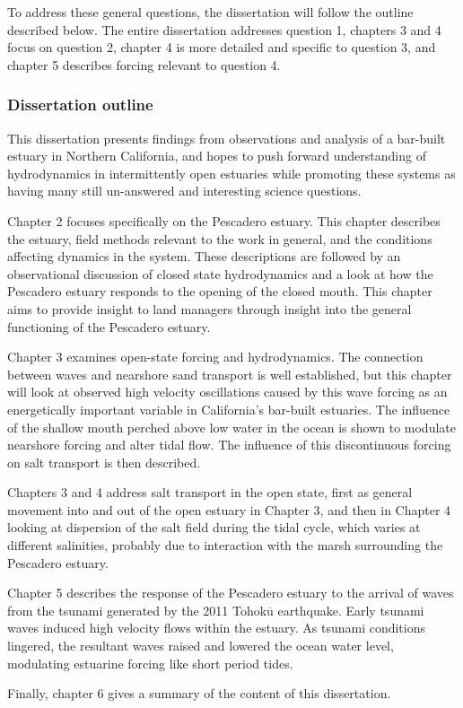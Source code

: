 To address these general questions, the dissertation will follow the outline described below. The entire dissertation addresses question 1, chapters 3 and 4 focus on question 2, chapter 4 is more detailed and specific to question 3, and chapter 5 describes forcing relevant to question 4.

\subsubsection{Dissertation outline}

This dissertation presents findings from observations and analysis of a bar-built estuary in Northern California, and hopes to push forward understanding of hydrodynamics in intermittently open estuaries while promoting these systems as having many still un-answered and interesting science questions.

Chapter 2 focuses specifically on the Pescadero estuary. This chapter describes the estuary, field methods relevant to the work in general, and the conditions affecting dynamics in the system. These descriptions are followed by an observational discussion of closed state hydrodynamics and a look at how the Pescadero estuary responds to the opening of the closed mouth. This chapter aims to provide insight to land managers through insight into the general functioning of the Pescadero estuary.

Chapter 3 examines open-state forcing and hydrodynamics. The connection between waves and nearshore sand transport is well established, but this chapter will look at observed high velocity oscillations caused by this wave forcing as an energetically important variable in California's bar-built estuaries. The influence of the shallow mouth perched above low water in the ocean is shown to modulate nearshore forcing and alter tidal flow. The influence of this discontinuous forcing on salt transport is then described.

Chapters 3 and 4 address salt transport in the open state, first as general movement into and out of the open estuary in Chapter 3, and then in Chapter 4 looking at dispersion of the salt field during the tidal cycle, which varies at different salinities, probably due to interaction with the marsh surrounding the Pescadero estuary.

Chapter 5 describes the response of the Pescadero estuary to the arrival of waves from the tsunami generated by the 2011 Tohok$\overline{\mathrm{u}}$ earthquake. Early tsunami waves induced high velocity flows within the estuary. As tsunami conditions lingered, the resultant waves raised and lowered the ocean water level, modulating estuarine forcing like short period tides. 

Finally, chapter 6 gives a summary of the content of this dissertation.







